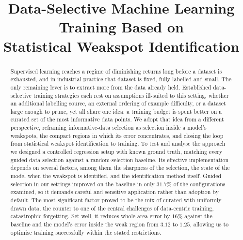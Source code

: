 \documentclass[conference]{IEEEtran}
\begin{document}
\title{Data-Selective Machine Learning Training Based on\\Statistical Weakspot Identification}

\author{\IEEEauthorblockN{}
}

\maketitle

\begin{abstract}
Supervised learning reaches a regime of diminishing returns long before a dataset is exhausted, and in industrial practice that dataset is fixed, fully labelled and small. The only remaining lever is to extract more from the data already held. Established data-selective training strategies each rest on assumptions ill-suited to this setting,
whether an additional labelling source, an external ordering of example difficulty, or a dataset large enough to prune, yet all share one idea: a training budget is spent better on a curated set of the most informative data points.
We adopt that idea from a different
perspective, reframing informative-data selection as selection inside a model's
weakspots, the compact regions in which its error concentrates, and closing the loop from statistical weakspot identification to training.
To test and analyse the approach we
designed a controlled regression setup with known ground truth, matching every guided data
selection against a random-selection baseline. Its effective implementation depends
on several factors, among them the sharpness of the selection, the state of the model
when the weakspot is identified, and the identification method itself. Guided
selection in our settings improved on the baseline in only $31.7\%$ of the configurations examined, so
it demands careful and sensitive application rather than adoption by default. The
most significant factor proved to be the mix of curated with uniformly drawn data,
the counter to one of the central challenges of data-centric training, catastrophic
forgetting. Set well, it reduces whole-area error by $16\%$ against the baseline and the
model's error inside the weak region from $3.12$ to $1.25$, allowing us to optimise
training successfully within the stated restrictions.
\end{abstract}
\end{document}
